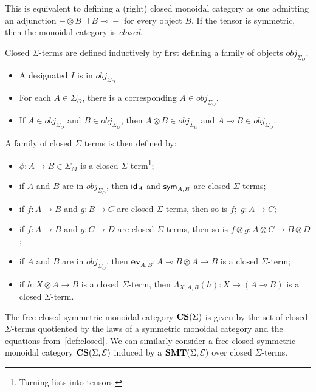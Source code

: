 This is equivalent to defining a (right) closed monoidal category as one admitting an adjunction $- \otimes B \dashv B \multimap{} -$ for every object $B$.
If the tensor is symmetric, then the monoidal category is \emph{closed}.

\begin{defi}
	Closed $\Sigma$-terms are defined inductively by first defining a family of objects $obj_{\Sigma_{O}}$.
	\begin{itemize}
		\item A designated $I$ is in $obj_{\Sigma_{O}}$.
		\item For each $A \in \Sigma_{O}$, there is a corresponding $A \in obj_{\Sigma_{O}}$.
		\item If $A \in obj_{\Sigma_{O}}$ and $B \in obj_{\Sigma_{O}}$, then $A \otimes B \in obj_{\Sigma_{O}}$ and $A \multimap B \in obj_{\Sigma_{O}}$.
	\end{itemize}
	A family of closed $\Sigma$ terms is then defined by:
	\begin{itemize}
		\item $\phi \colon A \to B \in \Sigma_{M}$ is a closed $\Sigma$-term\footnote{Turning lists into tensors.};
		\item if $A$ and $B$ are in $obj_{\Sigma_{O}}$, then $\textsf{id}_{A}$ and $\textsf{sym}_{A,B}$ are closed $\Sigma$-terms;
		\item if $f \colon A \to B$ and $g : B \to C$ are closed $\Sigma$-terms, then so is $f;\;g : A \to C$;
		\item if $f \colon A \to B$ and $g : C \to D$ are closed $\Sigma$-terms, then so is $f \otimes g \colon A \otimes C \to B \otimes D$;
		\item if $A$ and $B$ are in $obj_{\Sigma_{O}}$, then $\textbf{ev}_{A,B} \colon A \multimap B \otimes A \to B$ is a closed $\Sigma$-term;
		\item if $h \colon X \otimes A \to B$ is a closed $\Sigma$-term, then $\Lambda_{X,A,B}(h) \colon X \to (A \multimap B)$ is a closed $\Sigma$-term.
	\end{itemize}
\end{defi}

\begin{defi}
	The free closed symmetric monoidal category $\mathbf{CS}(\Sigma)$ is given by the set of closed $\Sigma$-terms quotiented by the laws of a symmetric monoidal category and the equations from~\autoref{def:closed}.
	We can similarly consider a free closed symmetric monoidal category $\mathbf{CS}(\Sigma, \mathcal{E})$ induced by a $\mathbf{SMT}(\Sigma, \mathcal{E})$ over closed $\Sigma$-terms.
\end{defi}

